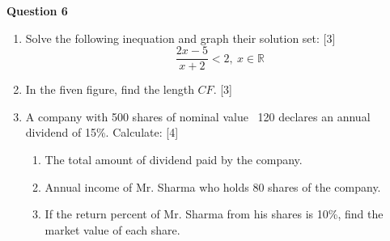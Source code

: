 \newpage
\noindent
\textbf{Question 6}
\begin{enumerate}[label=(\roman*)]

    \item Solve the following inequation and graph their solution set: \hfill [3]
        \[
            \frac{2x-5}{x+2} < 2, \ x \in \mathbb{R}
        \]

    \item In the fiven figure, find the length $CF$. \hfill [3]

    \item A company with 500 shares of nominal value \rupee~120 declares an 
        annual dividend of 15\%. Calculate: \hfill [4]
        \begin{enumerate}
            \setlength\itemsep{0em}
            \item The total amount of dividend paid by the company. 
            \item Annual income of Mr. Sharma who holds 80 shares of the company.
            \item If the return percent of Mr. Sharma from his shares is 10\%, 
                find the market value of each share.
        \end{enumerate}

\end{enumerate}

